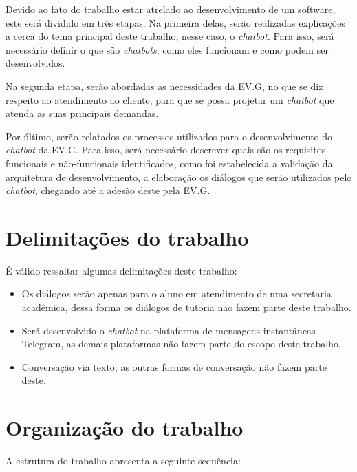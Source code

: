 Devido ao fato do trabalho estar atrelado ao desenvolvimento de um software, este será dividido em três etapas. 
Na primeira delas, serão realizadas explicações a cerca do tema principal deste trabalho, nesse caso, o \textit{chatbot}. Para isso, será necessário definir o que são \textit{chatbots}, como eles funcionam e como podem ser desenvolvidos.

Na segunda etapa, serão abordadas as necessidades da EV.G, no que se diz respeito ao atendimento ao cliente, para que se possa projetar um \textit{chatbot} que atenda as suas principais demandas.

Por último, serão relatados os processos utilizados para o desenvolvimento do \textit{chatbot} da EV.G. Para isso, será necessário descrever quais são os requisitos funcionais e não-funcionais identificados, como foi estabelecida a validação da arquitetura de desenvolvimento, a elaboração os diálogos que serão utilizados pelo \textit{chatbot}, chegando até a adesão deste pela EV.G.


\section{Delimitações do trabalho}\label{cap:01:sec:03:delimitacao}

É válido ressaltar algumas delimitações deste trabalho:

\begin{itemize}
    \item Os diálogos serão apenas para o aluno em atendimento de uma secretaria acadêmica, dessa forma os diálogos de tutoria não fazem parte deste trabalho.
    \item Será desenvolvido o \textit{chatbot} na plataforma de mensagens instantâneas Telegram, as demais plataformas não fazem parte do escopo deste trabalho.
    \item Conversação via texto, as outras formas de conversação não fazem parte deste.
\end{itemize}


\section{Organização do trabalho}

A estrutura do trabalho apresenta a seguinte sequência:

